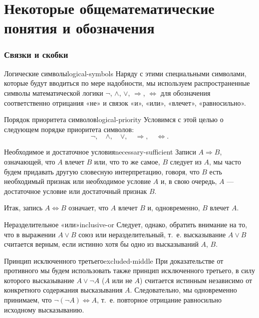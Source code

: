 \chapter{Некоторые общематематические понятия и обозначения}


\subsection{Связки и скобки}

\begin{definition}{Логические символы}{logical-symbols}
  Наряду с этими специальными символами, которые будут вводиться по мере
  надобности, мы используем распространенные символы математической логики
  $\neg$, $\land$, $\lor$, $\Rightarrow$, $\Leftrightarrow$ для обозначения
  соответственно отрицания «не» и связок «и», «или», «влечет»,
  «равносильно».
\end{definition}

\begin{properties}{Порядок приоритета символов}{logical-priority}
  Условимся с этой целью о следующем порядке приоритета символов:
  \[
    \neg,\quad \land,\quad \lor,\quad \Rightarrow,\quad \Leftrightarrow.
  \]
\end{properties}

\begin{definition}{Необходимое и достаточное условия}{necessary-sufficient}
  Записи $A\Rightarrow B$, означающей, что $A$ влечет $B$ или, что то же
  самое, $B$ следует из $A$, мы часто будем придавать другую словесную
  интерпретацию, говоря, что $B$ есть необходимый признак или необходимое
  условие $A$ и, в свою очередь, $A$ — достаточное условие или достаточный
  признак $B$.

  Итак, запись $A\Leftrightarrow B$ означает, что $A$ влечет $B$ и,
  одновременно, $B$ влечет $A$.
\end{definition}

\begin{definition}{Неразделительное «или»}{inclusive-or}
  Следует, однако, обратить внимание на то, что в выражении $A\lor B$ союз
  или неразделительный, т.~е. высказывание $A\lor B$ считается верным, если
  истинно хотя бы одно из высказываний $A$, $B$.
\end{definition}

\begin{properties}{Принцип исключенного третьего}{excluded-middle}
  При доказательстве от противного мы будем использовать также принцип
  исключенного третьего, в силу которого высказывание $A\lor\neg A$ ($A$
  или не $A$) считается истинным независимо от конкретного содержания
  высказывания $A$. Следовательно, мы одновременно принимаем, что
  $\neg(\neg A)\Leftrightarrow A$, т.~е. повторное отрицание равносильно
  исходному высказыванию.
\end{properties}

